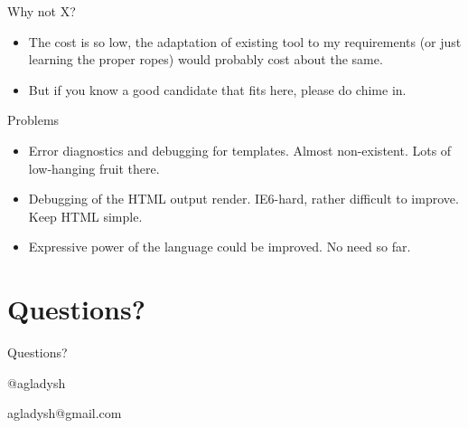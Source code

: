 \documentclass[aspectratio=43,handout,bigger]{beamer}
\begin{document}
\begin{frame}{Why not X?}
  \begin{itemize}
    \item The cost is so low, the adaptation of existing tool to my requirements
          (or just learning the proper ropes) would probably cost
          about the same.
    \item But if you know a good candidate that fits here, please do chime in.
  \end{itemize}
\end{frame}


\begin{frame}{Problems}
  \begin{itemize}
    \item Error diagnostics and debugging for templates.
          Almost non-existent. Lots of low-hanging fruit there.
    \item Debugging of the HTML output render. IE6-hard,
          rather difficult to improve. Keep HTML simple.
    \item Expressive power of the language could be improved.
          No need so far.
  \end{itemize}
\end{frame}




\section{Questions?}


\begin{frame}[plain]{Questions?}

\begin{center}
\Huge{@agladysh}
\end{center}

\begin{center}
\Large{agladysh@gmail.com}
\end{center}

\end{frame}

\end{document}
